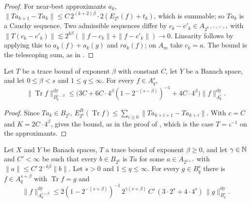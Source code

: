 \begin{proof}
\leanok
For near-best approximants $a_k$, $\|T a_{k+1} - T a_k\| \leq C \, 2^{(k+2)\beta} \cdot
2 (E_{2^k}(f) + t_k)$, which is summable; so $T a_k$ is a Cauchy sequence. Two admissible
sequences differ by $c_k - c'_k \in A_{2^{k+\gamma+\gamma'+1}}$ with
$\|T(c_k - c'_k)\| \lesssim 2^{k\beta} (\|f - c_k\| + \|f - c'_k\|) \to 0$. Linearity follows
by applying this to $a_k(f) + a_k(g)$ and $r a_k(f)$; on $A_m$ take $c_k = a$. The bound is the
telescoping sum, as in .
\end{proof}

\begin{theorem}
\label{thm:trace-transfer}
\leanok
{}
Let $T$ be a trace bound of exponent $\beta$ with constant $C$, let $Y$ be a Banach space, and
let $0 \leq \beta < s$ and $1 \leq q \leq \infty$. For every $f \in A^s_q$,
\[
  \|\operatorname{Tr} f\|^{\mathrm{dy}}_{B^{s-\beta}_q} \leq
  \bigl(3C + 6C \cdot 4^\beta (1 - 2^{-(s-\beta)})^{-1} + 4C \cdot 4^\beta\bigr)
  \|f\|^{\mathrm{dy}}_{A^s_q} .
\]
\end{theorem}

\begin{proof}
\leanok
{}
Since $T a_k \in B_{2^k}$, $E^B_{2^k}(\operatorname{Tr} f) \leq \sum_{i \geq 0}
\|T a_{k+i+1} - T a_{k+i}\|$. With $c = C$ and $K = 2C \cdot 4^\beta$,
 gives the bound, as in the proof of
, which is the case $T = \iota^{-1}$ on the approximants.
\end{proof}

\begin{theorem}
\label{thm:trace-surjective}
\leanok
{}
Let $X$ and $Y$ be Banach spaces, $T$ a trace bound of exponent $\beta \geq 0$, and let
$\gamma \in \mathbb{N}$ and $C' < \infty$ be such that every $b \in B_{2^k}$ is $T a$ for some
$a \in A_{2^{k+\gamma}}$ with $\|a\| \leq C' \, 2^{-k\beta} \|b\|$. Let $s > 0$ and
$1 \leq q \leq \infty$. For every $g \in B^s_q$ there is $f \in A^{s+\beta}_q$ with
$\operatorname{Tr} f = g$ and
\[
  \|f\|^{\mathrm{dy}}_{A^{s+\beta}_q} \leq 2 (1 - 2^{-(s+\beta)})^{-1} \, 2^{\gamma(s+\beta)}
  \, C' \, (3 \cdot 2^s + 4 \cdot 4^s) \, \|g\|^{\mathrm{dy}}_{B^s_q} .
\]
\end{theorem}

